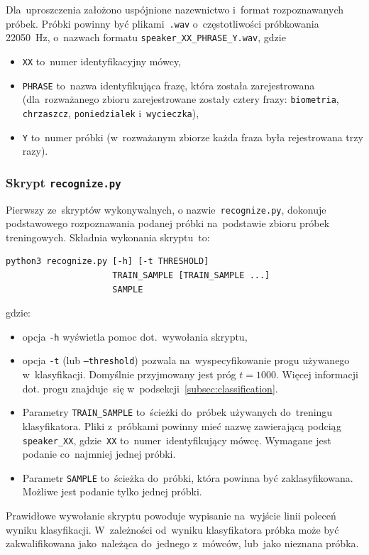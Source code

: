 \documentclass[11pt,a4paper]{article}
\begin{document}
Dla~uproszczenia założono uspójnione nazewnictwo i~format rozpoznawanych próbek.
Próbki powinny być plikami~\texttt{.wav} o~częstotliwości próbkowania 22050~Hz, o~nazwach formatu \texttt{speaker\_XX\_PHRASE\_Y.wav}, gdzie
\begin{itemize}
    \item \texttt{XX} to~numer identyfikacyjny mówcy,
    \item \texttt{PHRASE} to~nazwa identyfikująca frazę, która została zarejestrowana (dla~rozważanego zbioru zarejestrowane zostały cztery frazy: \texttt{biometria}, \texttt{chrzaszcz}, \texttt{poniedzialek} i~\texttt{wycieczka}),
    \item \texttt{Y} to~numer próbki (w~rozważanym zbiorze każda fraza była rejestrowana trzy razy).
\end{itemize}

\subsubsection{Skrypt \texttt{recognize.py}}

Pierwszy ze~skryptów wykonywalnych, o nazwie~\texttt{recognize.py}, dokonuje podstawowego rozpoznawania podanej próbki na~podstawie zbioru próbek treningowych.
Składnia wykonania skryptu~to:
\begin{verbatim}
python3 recognize.py [-h] [-t THRESHOLD]
                     TRAIN_SAMPLE [TRAIN_SAMPLE ...]
                     SAMPLE
\end{verbatim}
gdzie:
\begin{itemize}
    \item opcja \texttt{-h} wyświetla pomoc dot.~wywołania skryptu,
    \item opcja \texttt{-t} (lub \texttt{--threshold}) pozwala na~wyspecyfikowanie progu używanego w~klasyfikacji.
        Domyślnie przyjmowany jest próg $t = 1000$.
        Więcej informacji dot. progu znajduje~się w~podsekcji~\ref{subsec:classification}.
    \item Parametry \texttt{TRAIN\_SAMPLE} to~ścieżki do~próbek używanych do~treningu klasyfikatora.
        Pliki z~próbkami powinny mieć nazwę zawierającą podciąg \texttt{speaker\_XX}, gdzie~\texttt{XX} to~numer~identyfikujący mówcę.
        Wymagane jest podanie co~najmniej jednej próbki.
    \item Parametr \texttt{SAMPLE} to~ścieżka do~próbki, która powinna być zaklasyfikowana.
        Możliwe jest podanie tylko jednej próbki.
\end{itemize}
Prawidłowe wywołanie skryptu powoduje wypisanie na~wyjście linii poleceń wyniku klasyfikacji.
W~zależności od~wyniku klasyfikatora próbka może być zakwalifikowana jako~należąca do~jednego z~mówców, lub~jako nieznana próbka.
\end{document}
